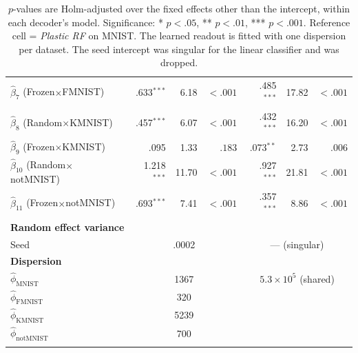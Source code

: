 {\begin{longtable}{l rrr rrr}
    $\hat{\beta}_{7}$ (Frozen$\times$FMNIST) & .633$^{***}$ & 6.18 & $<.001$ & .485$^{***}$ & 17.82 & $<.001$\\
    $\hat{\beta}_{8}$ (Random$\times$KMNIST) & .457$^{***}$ & 6.07 & $<.001$ & .432$^{***}$ & 16.20 & $<.001$\\
    $\hat{\beta}_{9}$ (Frozen$\times$KMNIST) & .095 & 1.33 & $.183$ & .073$^{**}$ & 2.73 & $.006$\\
    $\hat{\beta}_{10}$ (Random$\times$notMNIST) & 1.218$^{***}$ & 11.70 & $<.001$ & .927$^{***}$ & 21.81 & $<.001$\\
    $\hat{\beta}_{11}$ (Frozen$\times$notMNIST) & .693$^{***}$ & 7.41 & $<.001$ & .357$^{***}$ & 8.86 & $<.001$\\
    \midrule
    \multicolumn{7}{l}{\textbf{Random effect variance}}\\
    Seed & \multicolumn{3}{c}{.0002} & \multicolumn{3}{c}{--- (singular)}\\
    \multicolumn{7}{l}{\textbf{Dispersion}}\\
    $\hat{\phi}_{\text{MNIST}}$ & \multicolumn{3}{c}{1367} & \multicolumn{3}{c}{$5.3\times 10^{5}$ (shared)}\\
    $\hat{\phi}_{\text{FMNIST}}$ & \multicolumn{3}{c}{320} & \multicolumn{3}{c}{}\\
    $\hat{\phi}_{\text{KMNIST}}$ & \multicolumn{3}{c}{5239} & \multicolumn{3}{c}{}\\
    $\hat{\phi}_{\text{notMNIST}}$ & \multicolumn{3}{c}{700} & \multicolumn{3}{c}{}\\
    \bottomrule
    \caption*{$p$-values are Holm-adjusted over the fixed effects other than the intercept, within each decoder's model. Significance: * $p<.05$, ** $p<.01$, *** $p<.001$. Reference cell = \textit{Plastic RF} on MNIST. The learned readout is fitted with one dispersion per dataset. The seed intercept was singular for the linear classifier and was dropped.}
\end{longtable}
\setlength{\tabcolsep}{6pt}}
